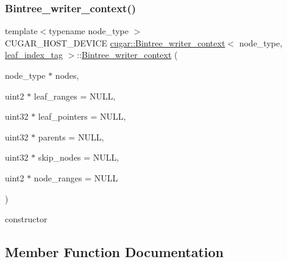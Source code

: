 \subsubsection{\texorpdfstring{Bintree\+\_\+writer\+\_\+context()}{Bintree\_writer\_context()}\hspace{0.1cm}{\footnotesize\ttfamily [2/2]}}
{\footnotesize\ttfamily template$<$typename node\+\_\+type $>$ \\
C\+U\+G\+A\+R\+\_\+\+H\+O\+S\+T\+\_\+\+D\+E\+V\+I\+CE \hyperlink{structcugar_1_1_bintree__writer__context}{cugar\+::\+Bintree\+\_\+writer\+\_\+context}$<$ node\+\_\+type, \hyperlink{structcugar_1_1leaf__index__tag}{leaf\+\_\+index\+\_\+tag} $>$\+::\hyperlink{structcugar_1_1_bintree__writer__context}{Bintree\+\_\+writer\+\_\+context} (\begin{DoxyParamCaption}\item[{node\+\_\+type $\ast$}]{nodes,  }\item[{uint2 $\ast$}]{leaf\+\_\+ranges = {\ttfamily NULL},  }\item[{uint32 $\ast$}]{leaf\+\_\+pointers = {\ttfamily NULL},  }\item[{uint32 $\ast$}]{parents = {\ttfamily NULL},  }\item[{uint32 $\ast$}]{skip\+\_\+nodes = {\ttfamily NULL},  }\item[{uint2 $\ast$}]{node\+\_\+ranges = {\ttfamily NULL} }\end{DoxyParamCaption})\hspace{0.3cm}{\ttfamily [inline]}}

constructor 

\subsection{Member Function Documentation}
\mbox{\label{structcugar_1_1_bintree__writer__context_3_01node__type_00_01leaf__index__tag_01_4_a534db89404f2a3a0375daec339ca640f}} 
